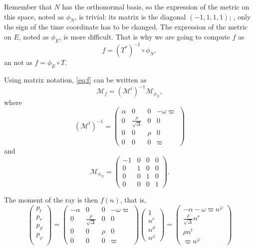 Remember that $N$ has the orthonormal basis, so the expression of the metric on this space, noted as $\phi_N$, is trivial: its matrix is the diagonal $(-1, 1, 1, 1)$; \ie, only the sign of the time coordinate has to be changed. The expression of the metric on $E$, noted as $\phi_E$, is more difficult. That is why we are going to compute $f$ as
\begin{equation}
	\label{eq:f}
	f = (T^*)^{-1} \circ \phi_N,
\end{equation}
an not as $f = \phi_E \circ T$.

Using matrix notation, \autoref{eq:f} can be written as
\begin{equation}
	\mathcal{M}_f = \left(\mathcal{M}^t\right)^{-1} \mathcal{M}_{\phi_N},
\end{equation}
where
\[
	\left(\mathcal{M}^t\right)^{-1} = \begin{pmatrix}
		\alpha & 0 & 0 & -\omega\varpi \\
		0 & \frac{\rho}{\sqrt{\Delta}} & 0 & 0 \\
		0 & 0 & \rho & 0 \\
		0 & 0 & 0 & \varpi
	\end{pmatrix}
\]
and
\[
	\mathcal{M}_{\phi_N} = \begin{pmatrix}
	-1 & 0 & 0 & 0\\
	0 & 1 & 0 & 0\\
	0 & 0 & 1 & 0\\
	0 & 0 & 0 & 1
	\end{pmatrix}.
\]

The moment of the ray is then $f(n)$, that is,
\begin{equation}
	\begin{pmatrix}
		p_t \\
		p_r \\
		p_\vartheta \\
		p_\varphi \\
	\end{pmatrix} = \begin{pmatrix}
		-\alpha & 0 & 0 & -\omega\varpi \\
		0 & \frac{\rho}{\sqrt{\Delta}} & 0 & 0 \\
		0 & 0 & \rho & 0 \\
		0 & 0 & 0 & \varpi
	\end{pmatrix}
	\begin{pmatrix}
		1 \\
		n^r \\
		n^\vartheta \\
		n^\varphi
	\end{pmatrix} = \begin{pmatrix}
		-\alpha - \omega\varpi n^\varphi \\
		\frac{\rho}{\sqrt{\Delta}} n^r \\
		\rho n^t \\
		\varpi n^\varphi
	\end{pmatrix}
\end{equation}

